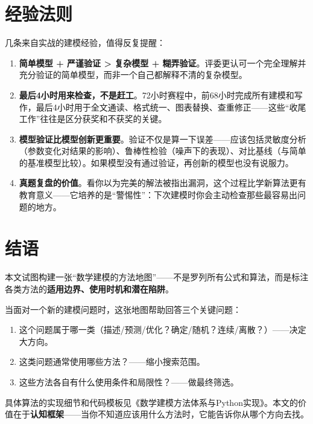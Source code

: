 \documentclass[12pt,a4paper]{ctexart}
\begin{document}
\section{经验法则}

几条来自实战的建模经验，值得反复提醒：

\begin{enumerate}[label=(\arabic*)]
    \item \textbf{简单模型 + 严谨验证 > 复杂模型 + 糊弄验证}。评委更认可一个完全理解并充分验证的简单模型，而非一个自己都解释不清的复杂模型。
    \item \textbf{最后4小时用来检查，不是赶工}。72小时赛程中，前68小时完成所有建模和写作，最后4小时用于全文通读、格式统一、图表替换、查重修正——这些``收尾工作''往往是区分获奖和不获奖的关键。
    \item \textbf{模型验证比模型创新更重要}。验证不仅是算一下误差——应该包括灵敏度分析（参数变化对结果的影响）、鲁棒性检验（噪声下的表现）、对比基线（与简单的基准模型比较）。如果模型没有通过验证，再创新的模型也没有说服力。
    \item \textbf{真题复盘的价值}。看你以为完美的解法被指出漏洞，这个过程比学新算法更有教育意义——它培养的是``警惕性''：下次建模时你会主动检查那些最容易出问题的地方。
\end{enumerate}

\section{结语}

本文试图构建一张``数学建模的方法地图''——不是罗列所有公式和算法，而是标注各类方法的\textbf{适用边界、使用时机和潜在陷阱}。

当面对一个新的建模问题时，这张地图帮助回答三个关键问题：
\begin{enumerate}[label=(\arabic*)]
    \item 这个问题属于哪一类（描述/预测/优化？确定/随机？连续/离散？）——决定大方向。
    \item 这类问题通常使用哪些方法？——缩小搜索范围。
    \item 这些方法各自有什么使用条件和局限性？——做最终筛选。
\end{enumerate}

具体算法的实现细节和代码模板见《数学建模方法体系与Python实现》。本文的价值在于\textbf{认知框架}——当你不知道应该用什么方法时，它能告诉你从哪个方向去找。
\end{document}
